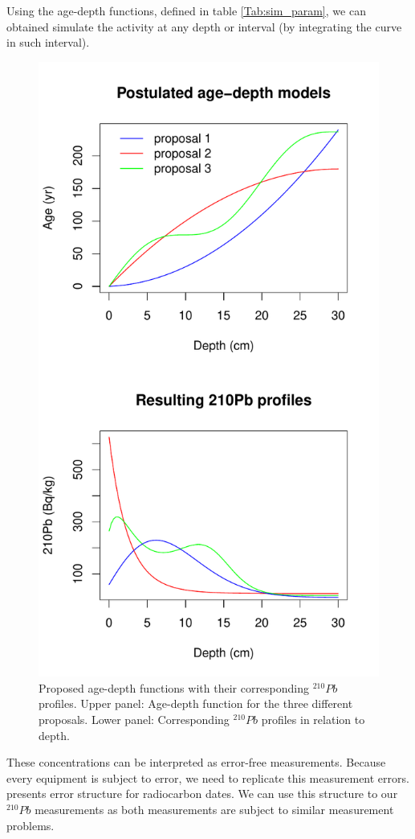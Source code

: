 \documentclass [10pt] {article}
\begin{document}
	Using the age-depth functions, defined in table \ref{Tab:sim_param}, we can obtained simulate the activity at any depth or interval (by integrating the curve in such interval). 
\begin{figure}
 \centering
  \includegraphics[width=0.75\linewidth]{Chronology-profile.pdf}
	\caption{Proposed age-depth functions with their corresponding $^{210}Pb$ profiles. Upper panel: Age-depth function for the three different proposals. Lower panel: Corresponding $^{210}Pb$ profiles in relation to depth.}
  \label{fig:true_210}
\end{figure}

	These concentrations can be interpreted as error-free measurements. Because every equipment is subject to error, we need to replicate this measurement errors. \citep{Blaauw2018} presents error structure for radiocarbon dates. We can use this structure to our $^{210}Pb$ measurements as both measurements are subject to similar measurement problems. 
\end{document}

